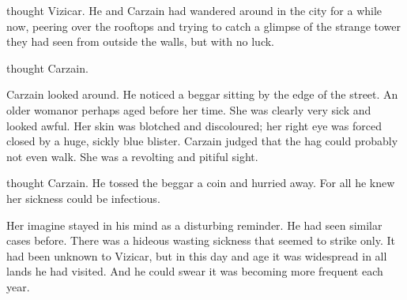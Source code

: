 \begin{comment}
  \subsection{Carzain sees Morbus but not Tower}
\end{comment}
 thought Vizicar. 
He and Carzain had wandered around in the city for a while now, peering over the rooftops and trying to catch a glimpse of the strange tower they had seen from outside the walls, but with no luck. 

 thought Carzain. 

Carzain looked around. 
He noticed a beggar sitting by the edge of the street. 
An older \human woman\prikker or perhaps aged before her time. 
She was clearly very sick and looked awful. 
Her skin was blotched and discoloured; her right eye was forced closed by a huge, sickly blue blister. 
Carzain judged that the hag could probably not even walk. 
She was a revolting and pitiful sight. 

 thought Carzain.
He tossed the beggar a coin and hurried away. 
For all he knew her sickness could be infectious. 

Her imagine stayed in his mind as a disturbing reminder. 
He had seen similar cases before. 
There was a hideous wasting sickness that seemed to strike \humans only. 
It had been unknown to Vizicar, but in this day and age it was widespread in all lands he had visited. 
And he could swear it was becoming more frequent each year. 







